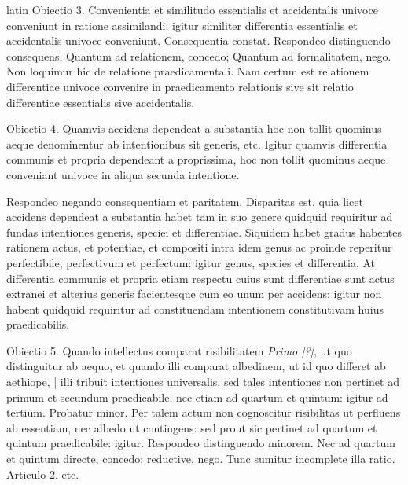 \begin{otherlanguage*}{latin}
\pstart
Obiectio 3. Convenientia et similitudo essentialis et accidentalis univoce conveniunt in ratione  assimilandi:
igitur similiter differentia essentialis et accidentalis univoce conveniunt. Consequentia constat. Respondeo distinguendo consequens. Quantum ad relationem, concedo; Quantum ad formalitatem, nego. Non loquimur hic de relatione praedicamentali. Nam certum est relationem differentiae univoce convenire in praedicamento relationis sive sit relatio differentiae essentialis sive accidentalis. 
\pend

\pstart
Obiectio 4. Quamvis accidens dependeat a substantia hoc non tollit quominus aeque denominentur ab intentionibus sit generis, etc. Igitur quamvis differentia communis et propria dependeant a proprissima, hoc non tollit quominus aeque conveniant univoce in aliqua secunda intentione. 
\pend

\pstart
Respondeo negando consequentiam et paritatem. Disparitas est, quia licet accidens dependeat a substantia habet tam in suo genere quidquid requiritur ad fundas intentiones generis, speciei et differentiae. Siquidem habet gradus habentes rationem actus, et potentiae, et compositi intra idem genus ac proinde reperitur perfectibile, perfectivum et perfectum:
igitur genus, species et differentia. At differentia communis et propria etiam respectu cuius sunt differentiae sunt actus extranei et alterius generis facientesque cum eo unum per accidens:
igitur non habent quidquid requiritur ad constituendam intentionem constitutivam huius praedicabilis. 
\pend

\pstart
Obiectio 5. Quando intellectus comparat risibilitatem \emph{Primo [?]}, ut quo distinguitur ab aequo, et quando illi comparat albedinem, ut id quo differet ab aethiope, \textnormal{|} illi tribuit intentiones universalis, sed tales intentiones non pertinet ad primum et secundum praedicabile, nec etiam ad quartum et quintum:
igitur ad tertium. Probatur minor. Per talem actum non cognoscitur risibilitas ut perfluens ab essentiam, nec albedo ut contingens:
sed prout sic pertinet ad quartum et quintum praedicabile:
igitur. Respondeo distinguendo minorem. Nec ad quartum et quintum directe, concedo; reductive, nego. Tunc sumitur incomplete illa ratio. Articulo 2. etc. 
\pend

\pstart
{}
\pend


\end{otherlanguage*}

